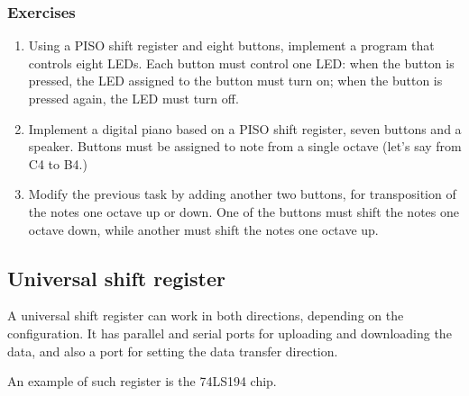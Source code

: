 \documentclass[../sparc.tex]{subfiles}
\begin{document}
\subsubsection{Exercises}

\begin{enumerate}
\item Using a PISO shift register and eight buttons, implement a program that
  controls eight LEDs.  Each button must control one LED: when the button is
  pressed, the LED assigned to the button must turn on; when the button is
  pressed again, the LED must turn off.
\item Implement a digital piano based on a PISO shift register, seven buttons
  and a speaker.  Buttons must be assigned to note from a single octave (let's
  say from C4 to B4.)
\item Modify the previous task by adding another two buttons, for transposition
  of the notes one octave up or down.  One of the buttons must shift the notes
  one octave down, while another must shift the notes one octave up.
\end{enumerate}

\subsection{Universal shift register}

A universal shift register can work in both directions, depending on the
configuration.  It has parallel and serial ports for uploading and downloading
the data, and also a port for setting the data transfer direction.

An example of such register is the 74LS194\cite{ti:sn74ls194a} chip.

\end{document}
